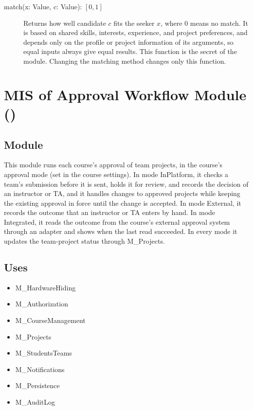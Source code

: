 \documentclass[12pt, titlepage]{article}
\newcommand{\moduleid}[1]{\texttt{\detokenize{#1}}}
\begin{document}
\begin{description}
    \item[match(x: Value, c: Value): {$[0,1]$}] Returns how well candidate $c$ fits the seeker $x$, where 0 means no match. It is based on shared skills, interests, experience, and project preferences, and depends only on the profile or project information of its arguments, so equal inputs always give equal results. This function is the secret of the module. Changing the matching method changes only this function.
\end{description}

\newpage

\section[MIS of Approval Workflow Module]{MIS of Approval Workflow Module (\moduleid{M_ApprovalWorkflow})}
\label{M_ApprovalWorkflow}

\subsection{Module}

This module runs each course's approval of team projects, in the course's approval mode (set in the course settings). In mode InPlatform, it checks a team's submission before it is sent, holds it for review, and records the decision of an instructor or TA, and it handles changes to approved projects while keeping the existing approval in force until the change is accepted. In mode External, it records the outcome that an instructor or TA enters by hand. In mode Integrated, it reads the outcome from the course's external approval system through an adapter and shows when the last read succeeded. In every mode it updates the team-project status through M\_Projects.

\subsection{Uses}

\begin{itemize}
    \item M\_HardwareHiding
    \item M\_Authorization
    \item M\_CourseManagement
    \item M\_Projects
    \item M\_StudentsTeams
    \item M\_Notifications
    \item M\_Persistence
    \item M\_AuditLog
\end{itemize}
\end{document}
